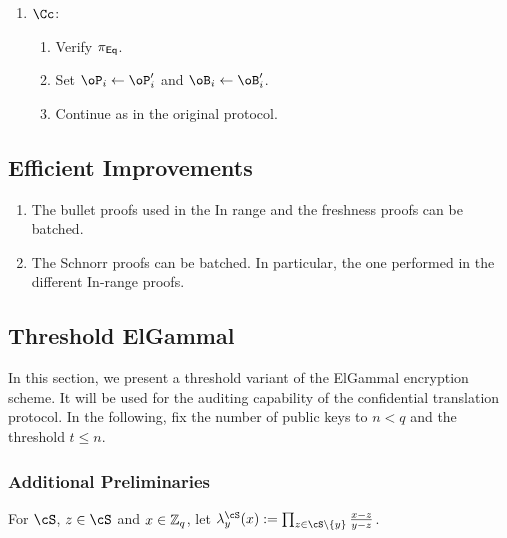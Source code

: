 \begin{enumerate}
\begin{enumerate}
		\item $\Cc$:
			\begin{enumerate}
				
					\item Verify $\pi_{\sf Eq}$.
				
				\item Set $\oP_i  \asn \oP_i'$  and $\oB_i  \asn \oB_i'$.
				
				\item Continue as in the original protocol.
			\end{enumerate}
		
	\end{enumerate}
\end{enumerate}


\subsection{Efficient Improvements}\label{sec:ChanksEg:EfficientImp}

\begin{enumerate}
	\item The bullet proofs used  in the In range and the freshness proofs can be batched. 
	
	\item The Schnorr proofs can be batched. In particular, the one performed in the different In-range proofs.  
\end{enumerate}



\newcommand{\tdKg}{\MathAlgX{TshGen}}

\newcommand{\tdEnc}{\MathAlgX{TshEnc}}
\newcommand{\tdDec}{\MathAlgX{TshDec}}

\subsection{Threshold ElGammal}\label{sec:ChanksEg:TDH}	

In this section, we present   a threshold  variant of the ElGammal encryption scheme. It will be used for the  auditing capability  of the confidential translation protocol.   In the following, fix the number of public keys to $n<q$ and the threshold $t \le n$. 


\subsubsection{Additional Preliminaries}\label{sec:ChanksEg:TDH:Pre}	
\begin{notation}
 	For $\cS$, $z\in \cS$ and $x\in {\mathbb Z}_q$, let $\lambda_y^\cS(x) \eqdef \prod_{z \in \cS \setminus \set{y}} \frac{x-z}{y-z}$.
\end{notation}

